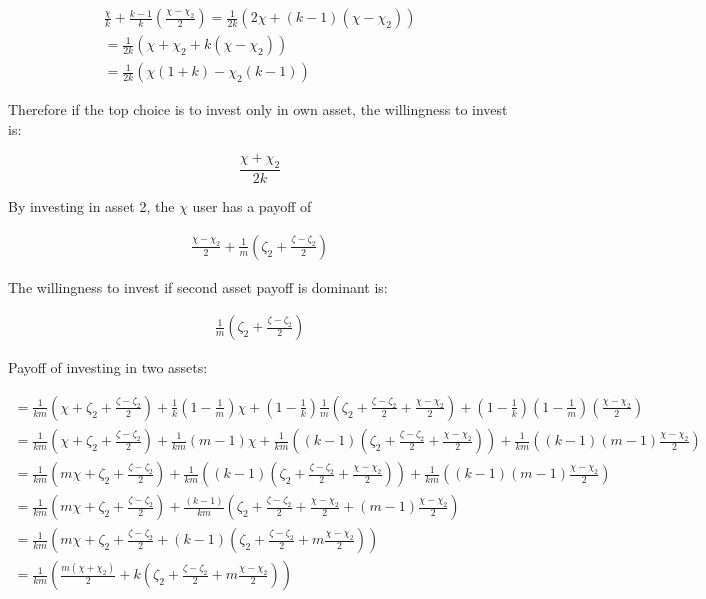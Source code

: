 \documentclass{article}
\begin{document}
\begin{align*}
\frac{\chi}{k}
+\frac{k-1}{k}
\left(\frac{\chi-\chi_{2}}{2}
\right)
= \frac{1}{2k}
 \left(
 2\chi+(k-1)(\chi-\chi_{2})
 \right) \\
= \frac{1}{2k}
 \left(
 \chi+\chi_{2}+k(\chi-\chi_{2})
 \right) \\
= \frac{1}{2k}
 \left(
 \chi(1+k)-\chi_{2}(k-1)
 \right)
\end{align*}

Therefore if the top choice is to invest only in own asset, the willingness to invest is: 

\begin{equation}
\frac{\chi+\chi_{2}}{2k}
\end{equation}

By investing in asset 2, the $\chi$ user has a payoff of

\begin{align*}
\frac{\chi-\chi_2}{2}
+\frac{1}{m}
\left(
\zeta_2 + \frac{\zeta-\zeta_2}{2}
\right)
\end{align*}

The willingness to invest if second asset payoff is dominant is: 

\begin{align*}
\frac{1}{m}
\left(
\zeta_2 + \frac{\zeta-\zeta_2}{2}
\right)
\end{align*}

Payoff of investing in two assets: 

\begin{align*}
=\frac{1}{km}
\left( 
\chi + \zeta_2 +\frac{\zeta-\zeta_2}{2}
\right) 
+
\frac{1}{k}
\left(
1-\frac{1}{m}
\right)
\chi 
+
\left( 
1-\frac{1}{k}
\right)
\frac{1}{m}
\left( 
\zeta_2+\frac{\zeta-\zeta_2}{2}+\frac{\chi-\chi_2}{2}
\right) 
+
\left( 
1-\frac{1}{k}
\right)
\left(
1-\frac{1}{m}
\right)
\left( 
\frac{\chi-\chi_2}{2}
\right) \\
=
\frac{1}{km}
\left( 
\chi + \zeta_2 +\frac{\zeta-\zeta_2}{2}
\right) 
+
\frac{1}{km}
(m-1)\chi 
+
\frac{1}{km}
\left( 
(k-1)(
\zeta_2+\frac{\zeta-\zeta_2}{2}+\frac{\chi-\chi_2}{2})
\right) 
+
\frac{1}{km}
\left( 
(k-1)(m-1)
\frac{\chi-\chi_2}{2}
\right) \\
=
\frac{1}{km}
\left( 
m\chi + \zeta_2 +\frac{\zeta-\zeta_2}{2}
\right) 
+
\frac{1}{km}
\left( 
(k-1)(
\zeta_2+\frac{\zeta-\zeta_2}{2}+\frac{\chi-\chi_2}{2})
\right) 
+
\frac{1}{km}
\left( 
(k-1)(m-1)
\frac{\chi-\chi_2}{2}
\right) \\
=
\frac{1}{km}
\left( 
m\chi + \zeta_2 +\frac{\zeta-\zeta_2}{2}
\right) 
+
\frac{(k-1)}{km}
\left( 
\zeta_2+\frac{\zeta-\zeta_2}{2}+\frac{\chi-\chi_2}{2}
+(m-1)\frac{\chi-\chi_2}{2}
\right) \\
=
\frac{1}{km}
\left( 
m\chi + \zeta_2 +\frac{\zeta-\zeta_2}{2}
+
(k-1)
\left( 
\zeta_2+\frac{\zeta-\zeta_2}{2}+m\frac{\chi-\chi_2}{2}
\right)
\right) \\
=
\frac{1}{km}
\left( 
\frac{m(\chi+\chi_2)}{2} 
+
k
\left( 
\zeta_2+\frac{\zeta-\zeta_2}{2}+m\frac{\chi-\chi_2}{2}
\right)
\right) \\
\end{align*}
\end{document}
